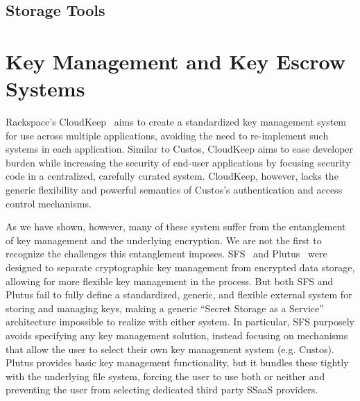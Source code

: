 \subsection{Storage Tools}

\cite{spideroak}


\section{Key Management and Key Escrow Systems}
\cite{blaze1996, denning1996}
\cite{cloudkeep-presentation, cloudkeep}
\cite{gazzang, porticor, rosen2012}
\cite{amazon-hsm}

Rackspace's CloudKeep~\cite{cloudkeep} aims to create a standardized
key management system for use across multiple applications, avoiding
the need to re-implement such systems in each application. Similar to
Custos, CloudKeep aims to ease developer burden while increasing the
security of end-user applications by focusing security code in a
centralized, carefully curated system. CloudKeep, however, lacks the
generic flexibility and powerful semantics of Custos's authentication
and access control mechanisms.

As we have shown, however, many
of these system suffer from the entanglement of key management and the
underlying encryption. We are not the first to recognize the
challenges this entanglement imposes. SFS~\cite{mazieres1999} and
Plutus~\cite{kallahalla2003} were designed to separate cryptographic
key management from encrypted data storage, allowing for more flexible
key management in the process. But both SFS and Plutus fail to fully
define a standardized, generic, and flexible external system for
storing and managing keys, making a generic ``Secret Storage as a
Service'' architecture impossible to realize with either system. In
particular, SFS purposely avoids specifying any key management
solution, instead focusing on mechanisms that allow the user to select
their own key management system (e.g. Custos). Plutus provides basic
key management functionality, but it bundles these tightly with the
underlying file system, forcing the user to use both or neither and
preventing the user from selecting dedicated third party SSaaS
providers.


